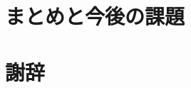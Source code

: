 \documentclass{deimj}
\begin{document}
\section{まとめと今後の課題}
\label{sec:Conclusions}




\section*{謝辞}
\end{document}
